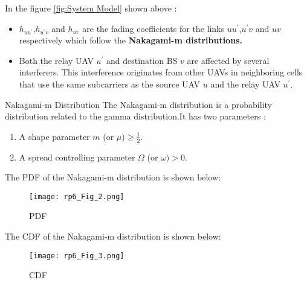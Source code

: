 \documentclass{beamer}
\begin{document}
\begin{frame}{}
In the figure \ref{fig:System Model} shown above :
\begin{itemize}
    \item $h_{uu^\prime}$,$h_{u^\prime v}$ and $h_{uv}$ are the fading coefficients for the links $uu^\prime$,$u^\prime v$ and $uv$ respectively which follow the \textbf{Nakagami-m distributions.}
    \item Both the relay UAV $u^\prime$ and destination BS $v$ are affected by several interferers. This interference originates from other UAVs in neighboring cells that use the same subcarriers as the source UAV $u$ and the relay UAV $u^\prime$.
\end{itemize}
\begin{block}{Nakagami-m Distribution}
The Nakagami-m distribution is a probability distribution related to the gamma distribution.It has two parameters :
\begin{enumerate}
\item A shape parameter $m$ (or $\mu) \geq \frac{1}{2}$.
\item A spread controlling parameter $\Omega$ (or $\omega)> 0$.
\end{enumerate}
\end{block}
\end{frame}

\begin{frame}{}
The PDF of the Nakagami-m distribution is shown below:
\begin{figure}[!ht]
    \centering
    \texttt{[image: rp6\_Fig\_2.png]}
    \caption{PDF}
    \label{fig:PDF}
\end{figure}
\end{frame}

\begin{frame}{}
 The CDF of the Nakagami-m distribution is shown below:
 \begin{figure}[!ht]
    \centering
    \texttt{[image: rp6\_Fig\_3.png]}
    \caption{CDF}
    \label{fig:CDF}
\end{figure}  
\end{frame}
\end{document}
